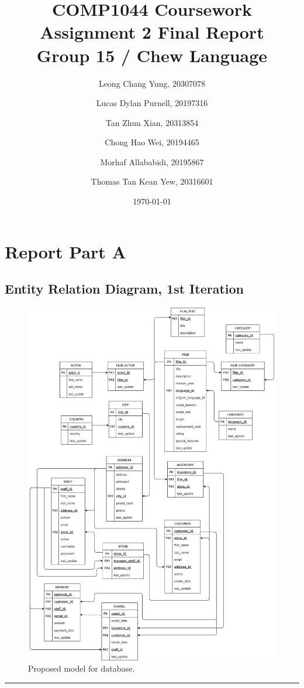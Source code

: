\documentclass[openany]{article}
\title{\textbf{COMP1044 Coursework Assignment 2 Final Report} \\ Group 15 / Chew Language}
\author{
	Leong Chang Yung, 20307078
	\and
	Lucas Dylan Purnell, 20197316
	\and
	Tan Zhun Xian, 20313854
	\and
	Chong Hao Wei, 20194465
	\and
	Morhaf Allababidi, 20195867
	\and
	Thomas Tan Kean Yew, 20316601
}
\date{\today}
\begin{document}
\maketitle
\newpage
\tableofcontents
\newpage

\section{Report Part A}
\subsection{Entity Relation Diagram, 1st Iteration}
	\begin{figure}[H]
		\includegraphics[width=\textwidth]{DBICourseworkA}
		\caption{Proposed model for database.}	
	\end{figure}
	\rule{\textwidth}{0.4pt}
		
\end{document}
